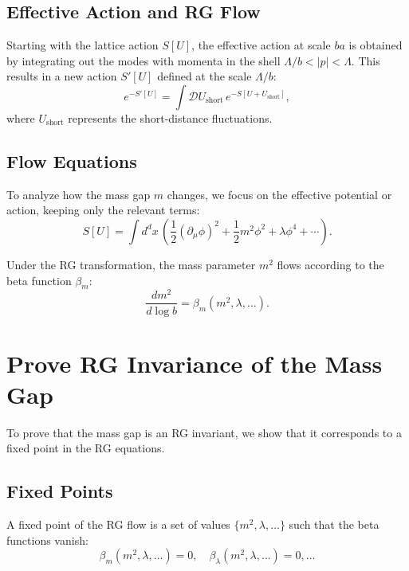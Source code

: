\subsection{Effective Action and RG Flow}

Starting with the lattice action \(S[U]\), the effective action at scale \(b a\) is obtained by integrating out the modes with momenta in the shell \(\Lambda/b < |p| < \Lambda\). This results in a new action \(S'[U]\) defined at the scale \(\Lambda/b\):
\begin{equation}
e^{-S'[U]} = \int \mathcal{D}U_{\text{short}} \, e^{-S[U + U_{\text{short}}]},
\end{equation}
where \(U_{\text{short}}\) represents the short-distance fluctuations.

\subsection{Flow Equations}

To analyze how the mass gap \(m\) changes, we focus on the effective potential or action, keeping only the relevant terms:
\begin{equation}
S[U] = \int d^dx \, \left( \frac{1}{2} (\partial_\mu \phi)^2 + \frac{1}{2} m^2 \phi^2 + \lambda \phi^4 + \cdots \right).
\end{equation}

Under the RG transformation, the mass parameter \(m^2\) flows according to the beta function \(\beta_m\):
\begin{equation}
\frac{dm^2}{d\log b} = \beta_m(m^2, \lambda, \ldots).
\end{equation}



\section{Prove RG Invariance of the Mass Gap}

To prove that the mass gap is an RG invariant, we show that it corresponds to a fixed point in the RG equations.

\subsection{Fixed Points}

A fixed point of the RG flow is a set of values \(\{m^2, \lambda, \ldots\}\) such that the beta functions vanish:
\begin{equation}
\beta_m(m^2, \lambda, \ldots) = 0, \quad \beta_\lambda(m^2, \lambda, \ldots) = 0, \ldots
\end{equation}

